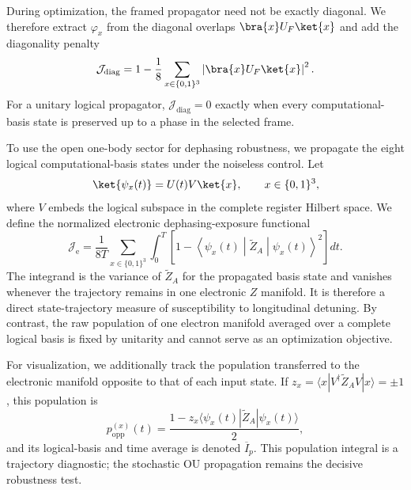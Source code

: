\documentclass[
  aps,
  pra,
  reprint,            %
  superscriptaddress, %
  amsmath,amssymb,
  notitlepage
]{revtex4-2}
\begin{document}
During optimization, the framed propagator need not be exactly diagonal. We therefore extract $\varphi_x$ from the diagonal overlaps $\bra{x}U_F\ket{x}$ and add the diagonality penalty
\begin{equation}
\mathcal J_{\mathrm{diag}}
=
1-\frac{1}{8}
\sum_{x\in\{0,1\}^3}
\left|\bra{x}U_F\ket{x}\right|^2.
\label{eq:diagonality_penalty}
\end{equation}
For a unitary logical propagator, $\mathcal J_{\mathrm{diag}}=0$ exactly when every computational-basis state is preserved up to a phase in the selected frame.

To use the open one-body sector for dephasing robustness, we propagate the eight logical computational-basis states under the noiseless control. Let
\begin{equation}
\ket{\psi_x(t)}=U(t)V\ket{x},
\qquad x\in\{0,1\}^3,
\end{equation}
where $V$ embeds the logical subspace in the complete register Hilbert space. We define the normalized electronic dephasing-exposure functional
\begin{equation}
\boxed{
\mathcal J_{\mathrm e}
=
\frac{1}{8T}
\sum_{x\in\{0,1\}^3}
\int_0^T
\left[
1-
\left\langle\psi_x(t)\middle|\widetilde Z_A\middle|\psi_x(t)\right\rangle^2
\right]dt .
}
\label{eq:electron_dephasing_exposure}
\end{equation}
The integrand is the variance of $\widetilde Z_A$ for the propagated basis state and vanishes whenever the trajectory remains in one electronic $Z$ manifold. It is therefore a direct state-trajectory measure of susceptibility to longitudinal detuning. By contrast, the raw population of one electron manifold averaged over a complete logical basis is fixed by unitarity and cannot serve as an optimization objective.

For visualization, we additionally track the population transferred to the electronic manifold opposite to that of each input state. If $z_x=\langle x|V^\dagger\widetilde Z_AV|x\rangle=\pm1$, this population is
\begin{equation}
p_{\mathrm{opp}}^{(x)}(t)
=
\frac{1-z_x\langle\psi_x(t)|\widetilde Z_A|\psi_x(t)\rangle}{2},
\label{eq:opposite_manifold_population}
\end{equation}
and its logical-basis and time average is denoted $\overline{I}_{p}$. This population integral is a trajectory diagnostic; the stochastic OU propagation remains the decisive robustness test.
\end{document}
